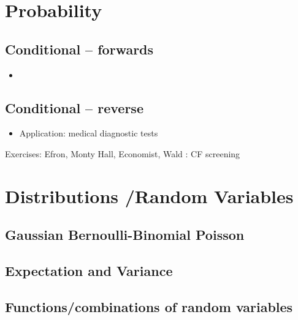 \documentclass[]{book}
\providecommand{\tightlist}{%
  \setlength{\itemsep}{0pt}\setlength{\parskip}{0pt}}
\begin{document}
\hypertarget{Probability}{%
\chapter{Probability}\label{Probability}}

\hypertarget{conditional-forwards}{%
\section{Conditional -- forwards}\label{conditional-forwards}}

\begin{itemize}
\item
\end{itemize}

\hypertarget{conditional-reverse}{%
\section{Conditional -- reverse}\label{conditional-reverse}}

\begin{itemize}
\tightlist
\item
  Application: medical diagnostic tests
\end{itemize}

Exercises: Efron, Monty Hall, Economist,
Wald : CF screening

\hypertarget{Distributions}{%
\chapter{Distributions /Random Variables}\label{Distributions}}

\hypertarget{gaussian-bernoulli-binomial-poisson}{%
\section{Gaussian Bernoulli-Binomial Poisson}\label{gaussian-bernoulli-binomial-poisson}}

\hypertarget{expectation-and-variance}{%
\section{Expectation and Variance}\label{expectation-and-variance}}

\hypertarget{functionscombinations-of-random-variables}{%
\section{Functions/combinations of random variables}\label{functionscombinations-of-random-variables}}
\end{document}
